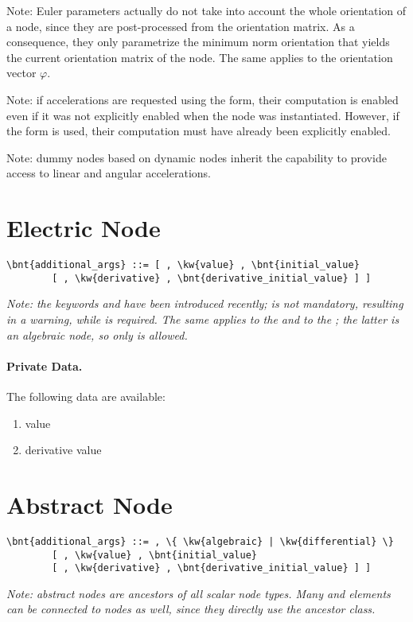 Note: Euler parameters actually do not take into account 
the whole orientation of a node, since they are post-processed
from the orientation matrix.
As a consequence, they only parametrize the minimum norm orientation
that yields the current orientation matrix of the node.
The same applies to the orientation vector $\varphi$.

Note: if accelerations are requested using the  form,
their computation is enabled even if it was not explicitly enabled
when the node was instantiated.
However, if the  form is used, their computation must have
already been explicitly enabled.

Note: dummy nodes based on dynamic nodes inherit the capability to provide
access to linear and angular accelerations.


\section{Electric Node}
\begin{Verbatim}[commandchars=\\\{\}]
    \bnt{additional_args} ::= [ , \kw{value} , \bnt{initial_value}
        [ , \kw{derivative} , \bnt{derivative_initial_value} ] ]
\end{Verbatim}
\emph{Note: the keywords  and 
have been introduced recently;  is not mandatory,
resulting in a warning, while  is required.
The same applies to the  
and to the ; the latter is an algebraic
node, so only  is allowed.
}

\paragraph{Private Data.}
\label{sec:NODE:ELECTRIC:PRIV}
The following data are available:
\begin{enumerate}
\item {} value
\item {} derivative value
\end{enumerate}





\section{Abstract Node}
\begin{Verbatim}[commandchars=\\\{\}]
    \bnt{additional_args} ::= , \{ \kw{algebraic} | \kw{differential} \}
        [ , \kw{value} , \bnt{initial_value}
        [ , \kw{derivative} , \bnt{derivative_initial_value} ] ]
\end{Verbatim}
\emph{
	Note: abstract nodes are ancestors of all scalar node types.
	Many  and  elements can be connected
	to  nodes as well, since they directly use
	the ancestor class. 
}

